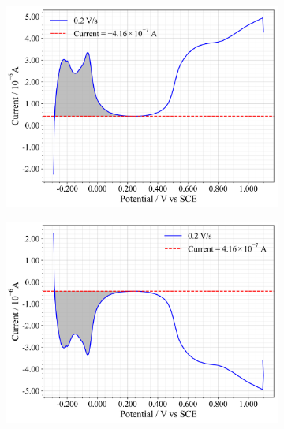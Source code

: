 \begin{figure}[htbp]
\begin{subfigure}{0.49\textwidth}
        \includegraphics[width=\linewidth]{figures2/5-3.png}
    \end{subfigure}
    \hfill
    \begin{subfigure}{0.49\textwidth}
        \centering
        \includegraphics[width=\linewidth]{figures2/5-4.png}
    \end{subfigure}
    \vspace{1em} %
    \begin{subfigure}{0.49\textwidth}
        \centering

\end{subfigure}
\end{figure}

